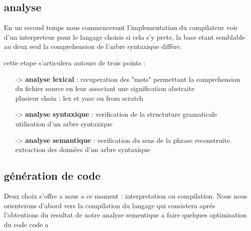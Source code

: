 \documentclass[a4paper,12pt]{article}
\begin{document}
\subsection{analyse}
En un second temps nous commenceront l'implementation du compilateur voir d'un
interpreteur pour le langage choisis si cela s'y prete, la base etant semblable
au deux seul la comprehension de l'arbre syntaxique diffère.

cette etape s'articulera autours de trois points : 
\begin{itemize}
\item[->] \textbf{analyse lexical} : recuperation des "mots" permettant la comprehension du fichier
source en leur associant une signification abstraite\\
plusieur choix : lex et yacc ou from scratch
\item[->] \textbf{analyse syntaxique} : verification de la structuture
gramaticale utilisation d'un arbre syntaxique\\
\item[->] \textbf{analyse semantique} : verification du sens de la phrase
reconstruite extraction des données d'un arbre syntaxique\\
\end{itemize}

\subsection{génération de code}
Deux choix s'offre a nous a ce moment : interpretation ou compilation. Nous
nous orienterons d'abord vers la compilation du langage qui consistera aprés
l'obtentions du resultat de notre analyse sementique a faire quelques
optimisation du code code a
\end{document}
